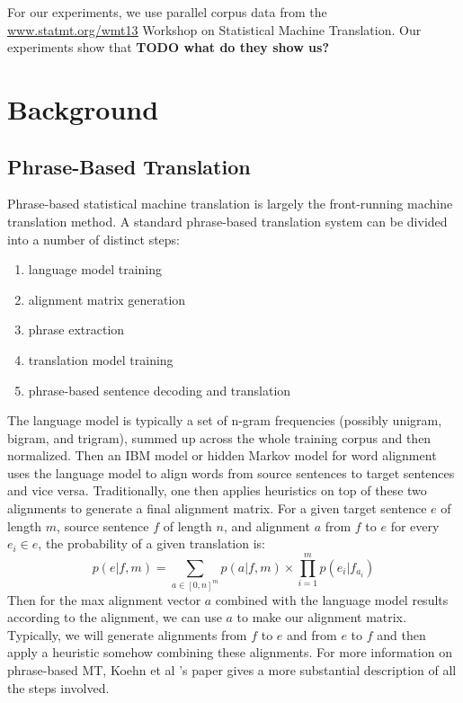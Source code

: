 \documentclass[twocolumn]{article}
\newcommand{\wrapSingleSpacing}[1]{
  \singlespacing
  #1
  \onehalfspacing
}
\begin{document}
For our experiments, we use parallel corpus data from the
\href{http://www.statmt.org/wmt13/training-parallel-nc-v8.tgz}
     {\underline{www.statmt.org/wmt13}}
Workshop on Statistical Machine Translation.
Our experiments show that \textbf{TODO what do they show us?}


\section{Background}
\subsection{Phrase-Based Translation}
Phrase-based statistical machine translation is largely the front-running
machine translation method. A standard phrase-based translation system can be
divided into a number of distinct steps:
\wrapSingleSpacing{
\begin{enumerate}
    \item language model training
    \item alignment matrix generation
    \item phrase extraction
    \item translation model training
    \item phrase-based sentence decoding and translation
\end{enumerate}
}
The language model is typically a set of n-gram frequencies (possibly unigram,
bigram, and trigram), summed up across the whole training corpus and then
normalized. Then an IBM model or hidden Markov model for word alignment uses the
language model to align words from source sentences to target sentences and vice
versa. Traditionally, one then applies heuristics on top of these two alignments
to generate a final alignment matrix.
For a given target sentence $e$ of length $m$, source sentence $f$ of length
$n$, and alignment $a$ from $f$ to $e$ for every $e_i \in e$, the probability of
a given translation is:
\[
  p(e | f, m) = \sum_{a \in [0, n]^m} p(a | f,m)
    \times \prod_{i=1}^m p(e_i | f_{a_i})
\]
Then for the max alignment vector $a$ combined with the language model results
according to the alignment, we can use $a$ to make our alignment
matrix. Typically, we will generate alignments from $f$ to $e$ and from $e$ to
$f$ and then apply a heuristic somehow combining these alignments.
For more information on phrase-based MT, Koehn et al \cite{kom2003}'s paper
gives a more substantial description of all the steps involved.
\end{document}
